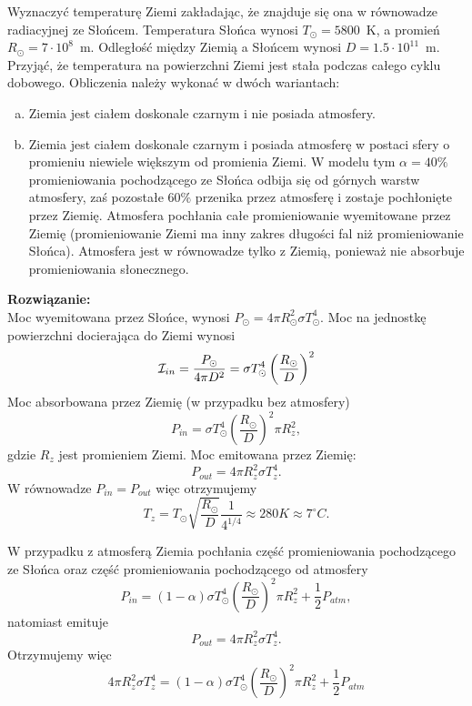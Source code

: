 \documentclass[11pt,a4paper]{article}
\begin{document}
Wyznaczyć temperaturę Ziemi zakładając, że znajduje się ona w równowadze radiacyjnej ze
Słońcem. Temperatura Słońca wynosi $T_\odot = 5800$~K, a promień $R_\odot = 7 \cdot 10^8$~m.
Odległość między Ziemią a Słońcem wynosi $D = 1.5 \cdot 10^{11}$~m. 
Przyjąć, że temperatura na powierzchni Ziemi jest stała podczas całego cyklu dobowego.
Obliczenia należy wykonać w dwóch wariantach:\\
\begin{enumerate}[a)]
        \item Ziemia jest ciałem doskonale czarnym i nie posiada atmosfery.
        \item Ziemia jest ciałem doskonale czarnym i posiada atmosferę w postaci sfery o promieniu niewiele większym od promienia Ziemi. 
        W modelu tym $\alpha=40\%$ promieniowania pochodzącego ze Słońca odbija się od górnych warstw atmosfery, zaś pozostałe $60\%$ 
        przenika przez atmosferę i zostaje pochłonięte przez Ziemię. Atmosfera pochłania całe promieniowanie wyemitowane przez Ziemię
  (promieniowanie Ziemi ma inny zakres długości fal niż promieniowanie Słońca). Atmosfera jest w równowadze tylko z Ziemią, 
  ponieważ nie absorbuje promieniowania słonecznego.
\end{enumerate}

\vskip 10pt
\textbf{Rozwiązanie:}\\
Moc wyemitowana przez Słońce, wynosi
$P_\odot = 4\pi R_\odot^2 \sigma T_\odot^4 $. Moc na jednostkę powierzchni docierająca
do Ziemi wynosi 
$$
{\cal I}_{in} = \frac{P_\odot}{ 4\pi D^2} =  \sigma T_\odot^4 \left(\frac{R_\odot}{D}\right)^2
$$
Moc absorbowana przez Ziemię (w przypadku bez atmosfery)
$$
P_{in} =  \sigma T_\odot^4 \left(\frac{R_\odot}{D}\right)^2 \pi R_z ^2,
$$
gdzie $R_z$ jest promieniem Ziemi.
Moc emitowana przez Ziemię:
$$
P_{out} = 4\pi R_z^2 \sigma T_z^4.
$$
W równowadze $P_{in}=P_{out}$ więc otrzymujemy
$$
T_z = T_\odot \sqrt{\frac{R_\odot}{ D}}\frac{1}{4^{1/4}} \approx 280 K \approx 7^\circ C.
$$

W przypadku z atmosferą 
Ziemia pochłania część promieniowania pochodzącego ze Słońca oraz część promieniowania 
pochodzącego od atmosfery 
$$
P_{in} = (1-\alpha)\sigma T_\odot^4 \left(\frac{R_\odot}{D}\right)^2 \pi R_z ^2
+ \frac{1}{2} P_{atm},
$$
natomiast emituje
$$
P_{out} = 4\pi R_z^2 \sigma T_z^4.
$$
Otrzymujemy więc
$$
4\pi R_z^2 \sigma T_z^4 = (1-\alpha)\sigma T_\odot^4 \left(\frac{R_\odot}{D}\right)^2 \pi R_z ^2
+ \frac{1}{2} P_{atm}
$$
\end{document}
